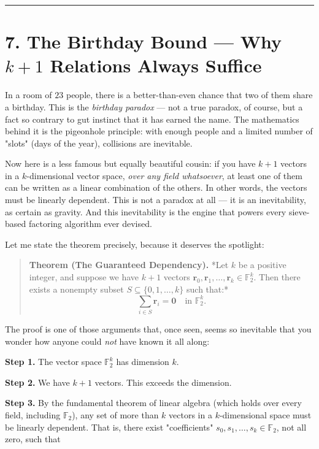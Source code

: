 \documentclass[11pt,openany]{book}
\theoremstyle{definition}
\theoremstyle{plain}
\theoremstyle{remark}
\begin{document}
\bigskip\noindent\rule{\textwidth}{0.4pt}\bigskip


\section{7. The Birthday Bound — Why $k + 1$ Relations Always Suffice}


In a room of $23$ people, there is a better-than-even chance that two of them share a birthday. This is the \textit{birthday paradox} — not a true paradox, of course, but a fact so contrary to gut instinct that it has earned the name. The mathematics behind it is the pigeonhole principle: with enough people and a limited number of "slots" (days of the year), collisions are inevitable.

Now here is a less famous but equally beautiful cousin: if you have $k + 1$ vectors in a $k$-dimensional vector space, \textit{over any field whatsoever}, at least one of them can be written as a linear combination of the others. In other words, the vectors must be linearly dependent. This is not a paradox at all — it is an inevitability, as certain as gravity. And this inevitability is the engine that powers every sieve-based factoring algorithm ever devised.

Let me state the theorem precisely, because it deserves the spotlight:

\begin{quote}
\textbf{Theorem (The Guaranteed Dependency).} *Let $k$ be a positive integer, and suppose we have $k + 1$ vectors $\mathbf{r}_0, \mathbf{r}_1, \ldots, \mathbf{r}_k \in \mathbb{F}_2^k$. Then there exists a nonempty subset $S \subseteq \{0, 1, \ldots, k\}$ such that:*
$$\sum_{i \in S} \mathbf{r}_i = \mathbf{0} \quad \text{in } \mathbb{F}_2^k.$$
\end{quote}


The proof is one of those arguments that, once seen, seems so inevitable that you wonder how anyone could \textit{not} have known it all along:

\textbf{Step 1.} The vector space $\mathbb{F}_2^k$ has dimension $k$.

\textbf{Step 2.} We have $k + 1$ vectors. This exceeds the dimension.

\textbf{Step 3.} By the fundamental theorem of linear algebra (which holds over every field, including $\mathbb{F}_2$), any set of more than $k$ vectors in a $k$-dimensional space must be linearly dependent. That is, there exist "coefficients" $s_0, s_1, \ldots, s_k \in \mathbb{F}_2$, not all zero, such that
\end{document}
